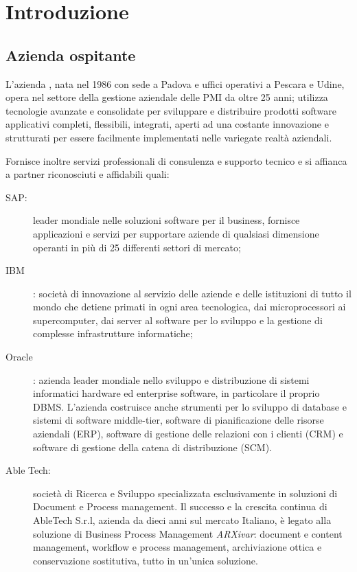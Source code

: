 \chapter{Introduzione}\label{ch:introduzione}

\section{Azienda ospitante}
L'azienda \myCompanyExtended, nata nel 1986 con sede a Padova e uffici operativi a Pescara e Udine, opera nel settore della gestione aziendale delle \acs{PMI} da oltre 25 anni; utilizza tecnologie avanzate e consolidate per sviluppare e distribuire prodotti software applicativi completi, flessibili, integrati, aperti ad una costante innovazione e strutturati per essere facilmente implementati nelle variegate realtà aziendali.

Fornisce inoltre servizi professionali di consulenza e supporto tecnico e si affianca a partner riconosciuti e affidabili quali:
\begin{description}
	\item[SAP:] leader mondiale nelle soluzioni software per il business, fornisce applicazioni e servizi per supportare aziende di qualsiasi dimensione operanti in più di 25 differenti settori di mercato;
	\item[IBM]: società di innovazione al servizio delle aziende e delle istituzioni di tutto il mondo che detiene primati in ogni area tecnologica, dai microprocessori ai supercomputer, dai server al software per lo sviluppo e la gestione di complesse infrastrutture informatiche;
	\item[Oracle]: azienda leader mondiale nello sviluppo e distribuzione di sistemi informatici hardware ed enterprise software, in particolare il proprio \ac{DBMS}.
	L'azienda costruisce anche strumenti per lo sviluppo di database e sistemi di software middle-tier, software di pianificazione delle risorse aziendali (\ac{ERP}), software di gestione delle relazioni con i clienti (\ac{CRM}) e software di gestione della catena di distribuzione (\ac{SCM}).
	\item[Able Tech:] società di Ricerca e Sviluppo specializzata esclusivamente in soluzioni di Document e Process management. Il successo e la crescita continua di AbleTech S.r.l, azienda da dieci anni sul mercato Italiano, è legato alla soluzione di Business Process Management \emph{ARXivar}: document e content management, workflow e process management, archiviazione ottica e conservazione sostitutiva, tutto in un'unica soluzione.
\end{description}


